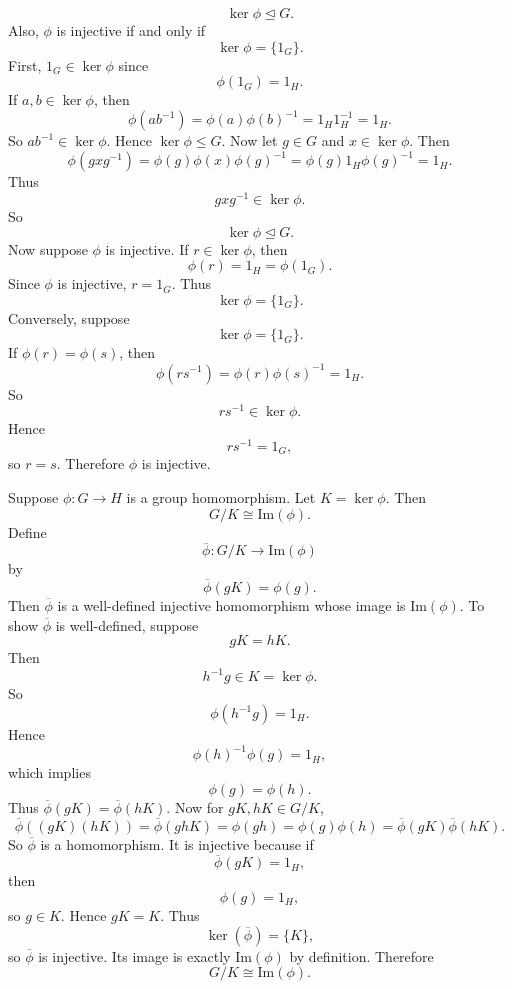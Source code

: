 \begin{proposition}{
    \[
        \ker\phi\trianglelefteq G.
    \]
    Also, $\phi$ is injective if and only if
    \[
        \ker\phi=\{1_G\}.
    \]
}
    First, $1_G\in \ker\phi$ since
    \[
        \phi(1_G)=1_H.
    \]
    If $a,b\in \ker\phi$, then
    \[
        \phi(ab^{-1})=\phi(a)\phi(b)^{-1}=1_{H}1_H^{-1}=1_H.
    \]
    So $ab^{-1}\in \ker\phi$.
    Hence $\ker\phi\leq G$.
    Now let $g\in G$ and $x\in \ker\phi$.
    Then
    \[
        \phi(gxg^{-1})=\phi(g)\phi(x)\phi(g)^{-1}=\phi(g)1_H\phi(g)^{-1}=1_H.
    \]
    Thus
    \[
        gxg^{-1}\in \ker\phi.
    \]
    So
    \[
        \ker\phi\trianglelefteq G.
    \]
    Now suppose $\phi$ is injective.
    If $r\in \ker\phi$, then
    \[
        \phi(r)=1_H=\phi(1_G).
    \]
    Since $\phi$ is injective, $r=1_G$.
    Thus
    \[
        \ker\phi=\{1_G\}.
    \]
    Conversely, suppose
    \[
        \ker\phi=\{1_G\}.
    \]
    If $\phi(r)=\phi(s)$, then
    \[
        \phi(rs^{-1})=\phi(r)\phi(s)^{-1}=1_H.
    \]
    So
    \[
        rs^{-1}\in \ker\phi.
    \]
    Hence
    \[
        rs^{-1}=1_G,
    \]
    so $r=s$.
    Therefore $\phi$ is injective.
\end{proposition}

\begin{theorem}{
    Suppose $\phi:G\to H$ is a group homomorphism.
    Let $K=\ker\phi$.
    Then
    \[
        G/K\cong \mathrm{Im}(\phi).
    \]
    Define
    \[
        \overline{\phi}:G/K\to \mathrm{Im}(\phi)
    \]
    by
    \[
        \overline{\phi}(gK)=\phi(g).
    \]
    Then $\overline{\phi}$ is a well-defined injective homomorphism whose image is $\mathrm{Im}(\phi)$.
}
To show $\overline{\phi}$ is well-defined, suppose
\[
    gK=hK.
\]
Then
\[
    h^{-1}g\in K=\ker\phi.
\]
So
\[
    \phi(h^{-1}g)=1_H.
\]
Hence
\[
    \phi(h)^{-1}\phi(g)=1_H,
\]
which implies
\[
    \phi(g)=\phi(h).
\]
Thus $\overline{\phi}(gK)=\overline{\phi}(hK)$.
Now for $gK,hK\in G/K$,
\[
    \overline{\phi}((gK)(hK))
    =
    \overline{\phi}(ghK)
    =
    \phi(gh)
    =
    \phi(g)\phi(h)
    =
    \overline{\phi}(gK)\overline{\phi}(hK).
\]
So $\overline{\phi}$ is a homomorphism.
It is injective because if
\[
    \overline{\phi}(gK)=1_H,
\]
then
\[
    \phi(g)=1_H,
\]
so $g\in K$.
Hence $gK=K$.
Thus
\[
    \ker(\overline{\phi})=\{K\},
\]
so $\overline{\phi}$ is injective.
Its image is exactly $\mathrm{Im}(\phi)$ by definition.
Therefore
\[
    G/K\cong \mathrm{Im}(\phi).
\]
\end{theorem}

